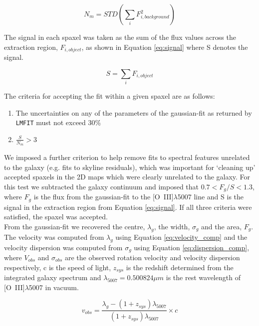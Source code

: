 \documentclass[fleqn,usenatbib]{mnras}
\begin{document}
\begin{equation}\label{eq:noise}
    N_{m} = STD\left(\sum_{i}F_{i,background}^{2}\right)
\end{equation}

The signal in each spaxel was taken as the sum of the flux values across the extraction region, $F_{i,object}$, as shown in Equation \ref{eq:signal} where S denotes the signal.

\begin{equation}\label{eq:signal}
    S = \sum_{i}F_{i,object}
\end{equation}

The criteria for accepting the fit within a given spaxel are as follows:

\begin{enumerate}[label=(\roman*),align=left]
\item The uncertainties on any of the parameters of the gaussian-fit as returned by {\tt LMFIT} must not exceed 30\%
\item $\frac{S}{N_{m}} > 3$
\end{enumerate}

We imposed a further criterion to help remove fits to spectral features unrelated to the galaxy (e.g. fits to skyline residuals), which was important for `cleaning up' accepted spaxels in the 2D maps which were clearly unrelated to the galaxy. For this test we subtracted the galaxy continuum and imposed that $0.7 < F_{g}/{S} < 1.3$, where $F_{g}$ is the flux from the gaussian-fit to the [O~{\sc III}]$\lambda$5007 line and S is the signal in the extraction region from Equation \ref{eq:signal}. If all three criteria were satisfied, the spaxel was accepted. \\

From the gaussian-fit we recovered the centre, $\lambda_{g}$, the width, $\sigma_{g}$ and the area, $F_{g}$.
The velocity was computed from $\lambda_{g}$ using Equation \ref{eq:velocity_comp} and the velocity dispersion was computed from $\sigma_{g}$ using Equation \ref{eq:dispersion_comp}, where $V_{obs}$ and $\sigma_{obs}$ are the observed rotation velocity and velocity dispersion respectively, c is the speed of light, $z_{sys}$ is the redshift determined from the integrated galaxy spectrum and $\lambda_{5007} = 0.500824\mu m$ is the rest wavelength of [O~{\sc III}]$\lambda$5007 in vacuum.

\begin{equation}\label{eq:velocity_comp}
   v_{obs} = \frac{\lambda_{g} - (1 + z_{sys})\lambda_{5007}}{(1 + z_{sys})\lambda_{5007}} \times c
\end{equation}
\end{document}
